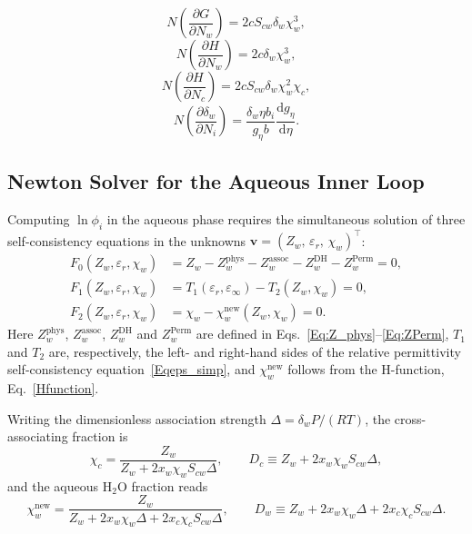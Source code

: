 \begin{equation}
        N\left ( \frac{\partial G}{\partial N_w} \right ) =2  c S_{cw} \delta_w \chi_w^3,
        \label{NdGdNw}
\end{equation} 
\begin{equation}
        N\left ( \frac{\partial H}{\partial N_w} \right ) =2  c \delta_w \chi_w^3,
        \label{NdHdNw}
\end{equation} 
\begin{equation}
        N\left ( \frac{\partial H}{\partial N_c} \right ) =2  c S_{cw} \delta_w \chi_w^2 \chi_c,
        \label{NdHdNc}
\end{equation} 
\begin{equation}
        N\left ( \frac{\partial \delta_w}{\partial N_i} \right ) = \frac{\delta_w \eta b_i}{g_\eta b} \frac{\mathrm{d} g_\eta} {\mathrm{d} \eta}.
        \label{NddeltadNi}
\end{equation}


\subsection{Newton Solver for the Aqueous Inner Loop}

Computing $\ln\phi_i$ in the aqueous phase requires the simultaneous solution of
three self-consistency equations in the unknowns
$\mathbf{v} = (Z_w,\,\varepsilon_r,\,\chi_w)^\top$:
\begin{align}
  F_0(Z_w, \varepsilon_r, \chi_w) &= Z_w - Z_w^{\text{phys}} - Z_w^{\text{assoc}}
    - Z_w^{\text{DH}} - Z_w^{\text{Perm}} = 0, \label{Eq:F0} \\
  F_1(Z_w, \varepsilon_r, \chi_w) &= T_1(\varepsilon_r,\varepsilon_\infty)
    - T_2(Z_w, \chi_w) = 0, \label{Eq:F1} \\
  F_2(Z_w, \varepsilon_r, \chi_w) &= \chi_w - \chi_w^{\text{new}}(Z_w, \chi_w) = 0. \label{Eq:F2}
\end{align}
Here $Z_w^{\text{phys}}$, $Z_w^{\text{assoc}}$, $Z_w^{\text{DH}}$ and $Z_w^{\text{Perm}}$
are defined in Eqs.~\eqref{Eq:Z_phys}--\eqref{Eq:ZPerm}, $T_1$ and $T_2$ are,
respectively, the left- and right-hand sides of the relative permittivity
self-consistency equation~\eqref{Eqeps_simp},
and $\chi_w^{\text{new}}$ follows from the H-function, Eq.~\eqref{Hfunction}.

Writing the dimensionless association strength $\Delta = \delta_w P/(RT)$, the
cross-associating fraction is
\begin{equation}
  \chi_c = \frac{Z_w}{Z_w + 2x_w \chi_w S_{cw} \Delta}, \qquad
  D_c \equiv Z_w + 2x_w \chi_w S_{cw} \Delta,
  \label{Eq:chic_Zform}
\end{equation}
and the aqueous H$_2$O fraction reads
\begin{equation}
  \chi_w^{\text{new}} = \frac{Z_w}{Z_w + 2x_w \chi_w \Delta + 2x_c \chi_c S_{cw} \Delta},
  \qquad D_w \equiv Z_w + 2x_w \chi_w \Delta + 2x_c \chi_c S_{cw} \Delta.
  \label{Eq:chiw_Zform}
\end{equation}


